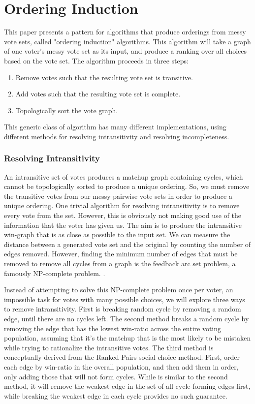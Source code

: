 \documentclass[letterpaper]{article} %
\begin{document}
\section{Ordering Induction}
This paper presents a pattern for algorithms that produce orderings from messy vote sets, called "ordering induction" algorithms. This algorithm will take a graph of one voter's messy vote set as its input, and produce a ranking over all choices based on the vote set. The algorithm proceeds in three steps:

\begin{enumerate}
\item Remove votes such that the resulting vote set is transitive.
\item Add votes such that the resulting vote set is complete.
\item Topologically sort the vote graph.
\end{enumerate}

This generic class of algorithm has many different implementations, using different methods for resolving intransitivity and resolving incompleteness.

\subsubsection{Resolving Intransitivity}
An intransitive set of votes produces a matchup graph containing cycles, which cannot be topologically sorted to produce a unique ordering. So, we must remove the transitive votes from our messy pairwise vote sets in order to produce a unique ordering. One trivial algorithm for resolving intransitivity is to remove every vote from the set. However, this is obviously not making good use of the information that the voter has given us. The aim is to produce the intransitive win-graph that is as close as possible to the input set. We can measure the distance between a generated vote set and the original by counting the number of edges removed. However, finding the minimum number of edges that must be removed to remove all cycles from a graph is the feedback arc set problem, a famously NP-complete problem. \cite{Karp1972}. 

Instead of attempting to solve this NP-complete problem once per voter, an impossible task for votes with many possible choices, we will explore three ways to remove intransitivity. First is breaking random cycle by removing a random edge, until there are no cycles left. The second method breaks a random cycle by removing the edge that has the lowest win-ratio across the entire voting population, assuming that it's the matchup that is the most likely to be mistaken while trying to rationalize the intransitive votes. The third method is conceptually derived from the Ranked Pairs social choice method. First, order each edge by win-ratio in the overall population, and then add them in order, only adding those that will not form cycles. While is similar to the second method, it will remove the weakest edge in the set of all cycle-forming edges first, while breaking the weakest edge in each cycle provides no such guarantee.
\end{document}
